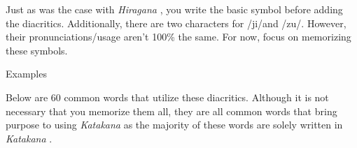 \par{ Just as was the case with \emph{Hiragana }, you write the basic symbol before adding the diacritics. Additionally, there are two characters for \slash ji\slash  and \slash zu\slash . However, their pronunciations\slash usage aren't 100\% the same. For now, focus on memorizing these symbols. }

\begin{center}
Examples 
\end{center}

\par{ Below are 60 common words that utilize these diacritics. Although it is not necessary that you memorize them all, they are all common words that bring purpose to using \emph{Katakana }as the majority of these words are solely written in \emph{Katakana }. }


